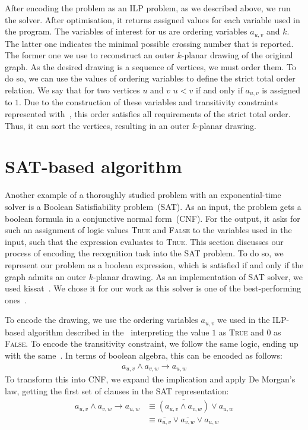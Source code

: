 After encoding the problem as an ILP problem, as we described above, we run the solver. After optimisation, it returns assigned values for each variable used in the program. The variables of interest for us are ordering variables \(a_{u, v}\) and \(k\). The latter one indicates the minimal possible crossing number that is reported. The former one we use to reconstruct an outer \(k\)-planar drawing of the original graph. As the desired drawing is a sequence of vertices, we must order them. To do so, we can use the values of ordering variables to define the strict total order relation. We say that for two vertices \(u\) and \(v\) \(u < v\) if and only if \(a_{u, v}\) is assigned to \(1\). Due to the construction of these variables and transitivity constraints represented with~, this order satisfies all requirements of the strict total order. Thus, it can sort the vertices, resulting in an outer \(k\)-planar drawing.


\section{SAT-based algorithm}\label{sec:SAT-def}

Another example of a thoroughly studied problem with an exponential-time solver is a Boolean Satisfiability problem~(SAT). As an input, the problem gets a boolean formula in a conjunctive normal form~(CNF). For the output, it asks for such an assignment of logic values \textsc{True} and \textsc{False} to the variables used in the input, such that the expression evaluates to \textsc{True}. This section discusses our process of encoding the recognition task into the SAT problem. To do so, we represent our problem as a boolean expression, which is satisfied if and only if the graph admits an outer \(k\)-planar drawing. As an implementation of SAT solver, we used kissat~\cite{kissat,kissat-library}. We chose it for our work as this solver is one of the best-performing ones~\cite{sat-competition}.

To encode the drawing, we use the ordering variables \(a_{u, v}\) we used in the ILP-based algorithm described in the~ interpreting the value \(1\) as \textsc{True} and \(0\) as \textsc{False}. To encode the transitivity constraint, we follow the same logic, ending up with the same~. In terms of boolean algebra, this can be encoded as follows:
\begin{align*}
    a_{u, v} \land a_{v, w} \rightarrow a_{u, w}
\end{align*}
To transform this into CNF, we expand the implication and apply De Morgan's law, getting the first set of clauses in the SAT representation:
\begin{align}
    a_{u, v} \land a_{v, w} \rightarrow a_{u, w}
    &\equiv \overline{(a_{u, v} \land a_{v, w})} \lor a_{u, w} \nonumber \\
    &\equiv \overline{a_{u, v}} \lor \overline{a_{v, w}} \lor a_{u, w} \label{sat:trans}
\end{align}

